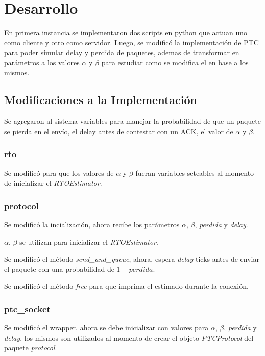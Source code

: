 \section{Desarrollo}

    En primera instancia se implementaron dos scripts en python que 
    actuan uno como cliente y otro como servidor.
    Luego, se modific\'o la implementaci\'on de PTC para poder simular
    delay y perdida de paquetes, ademas de transformar en par\'ametros
    a los valores $\alpha$ y $\beta$ para estudiar como se modifica el
    \rto{} en base a los mismos.  

  \subsection{Modificaciones a la Implementaci\'on}
    Se agregaron al sistema variables para manejar la probabilidad de que 
    un paquete se pierda en el env\'io, el delay antes de contestar con 
    un ACK, el valor de $\alpha$ y $\beta$.

    \subsubsection{rto}
    Se modific\'o para que los valores de $\alpha$ y $\beta$ fueran 
    variables seteables al momento de inicializar el \textit{RTOEstimator}.
    
    \subsubsection{protocol}
    Se modific\'o la incializaci\'on, ahora recibe los par\'ametros 
    $\alpha$, $\beta$, \textit{perdida} y \textit{delay}.
    
    $\alpha$, $\beta$ se utilizan para inicializar el \textit{RTOEstimator}.
    
    Se modific\'o el m\'etodo \textit{send\_and\_queue}, ahora, espera 
    \textit{delay} ticks antes de enviar el paquete con una probabilidad
    de $1-perdida$.

    Se modific\'o el m\'etodo \textit{free} para que imprima el \rto{} 
    estimado durante la conexi\'on.        
    
    \subsubsection{ptc\_socket}
    Se modific\'o el wrapper, ahora se debe inicializar con valores para 
    $\alpha$, $\beta$, \textit{perdida} y \textit{delay}, los mismos son
    utilizados al momento de crear el objeto \textit{PTCProtocol} del 
    paquete \textit{protocol}.
    
